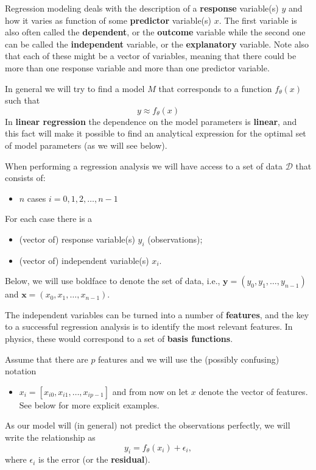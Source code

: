 \documentclass[%
oneside,                 %
final,                   %
10pt]{article}
\newenvironment{block_mdfboxadmon}[1][]{
\begin{block_mdfboxmdframed}[frametitle=#1]
}
{
\end{block_mdfboxmdframed}
}
\begin{document}
\begin{block_mdfboxadmon}[]

Regression modeling deals with the description of a \textbf{response} variable(s) $y$ and how it varies as function of some \textbf{predictor} variable(s) $x$. The first variable is also often called the \textbf{dependent}, or the \textbf{outcome} variable while the second one can be called the \textbf{independent} variable, or the \textbf{explanatory} variable. Note also that each of these might be a vector of variables, meaning that there could be more than one response variable and more than one predictor variable. 

In general we will try to find a model $M$ that corresponds to a function $f_\theta(x)$ such that 
\[
y \approx f_\theta(x)
\]
In \textbf{linear regression} the dependence on the model parameters is \textbf{linear}, and this fact will make it possible to find an analytical expression for the optimal set of model parameters (as we will see below).
\end{block_mdfboxadmon} %





\begin{block_mdfboxadmon}[]
When performing a regression analysis we will have access to a set of data $\mathcal{D}$ that consists of:
\begin{itemize}
\item $n$ cases $i = 0, 1, 2, \dots, n-1$ 
\end{itemize}

\noindent
For each case there is a
\begin{itemize}
\item (vector of) response variable(s) $y_i$ (observations);

\item (vector of) independent variable(s) $x_i$.
\end{itemize}

\noindent
Below, we will use boldface to denote the set of data, i.e., $\bm{y} = (y_0, y_1,\ldots, y_{n-1})$ and $\bm{x} = (x_0, x_1,\ldots, x_{n-1})$.

The independent variables can be turned into a number of \textbf{features}, and the key to a successful regression analysis is to identify the most relevant features. In physics, these would correspond to a set of \textbf{basis functions}.

Assume that there are $p$ features and we will use the (possibly confusing) notation
\begin{itemize}
\item $x_i=[x_{i0}, x_{i1}, \dots, x_{ip-1}]$ and from now on let $x$ denote the vector of features. See below for more explicit examples. 
\end{itemize}

\noindent
As our model will (in general) not predict the observations perfectly, we will write the relationship as
\[
y_i = f_\theta(x_i) + \epsilon_i,
\]
where $\epsilon_i$ is the error (or the \textbf{residual}).
\end{block_mdfboxadmon} %
\end{document}
